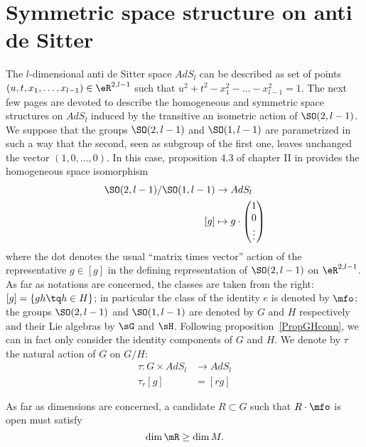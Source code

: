 \section{Symmetric space structure on anti de Sitter}\label{SecSymeStructAdS}

The $l$-dimensional anti de Sitter space $AdS_l$ can be described as set of points $(u,t,x_1,\ldots,x_{l-1})\in \eR^{2,l-1}$  such that $u^2+t^2-x_1^2-\ldots-x_{l-1}^2=1$. The next few pages are devoted to describe the homogeneous and symmetric space structures on $AdS_l$ induced by the transitive an isometric action of $\SO(2,l-1)$. We suppose that the groups $\SO(2,l-1)$ and $\SO(1,l-1)$ are parametrized in such a way that the second, seen as subgroup of the first one, leaves unchanged the vector $(1,0,\ldots,0)$. In this case, proposition 4.3 of chapter II in \cite{Helgason} provides the homogeneous space isomorphism
\begin{equation}
\begin{aligned}
  \SO(2,l-1)/\SO(1,l-1)&\to AdS_l \\
[g]&\mapsto
 g\cdot
\begin{pmatrix}
1\\0\\\vdots
\end{pmatrix}
\end{aligned}
\end{equation}
where the dot denotes the usual ``matrix times vector'' action of the representative $g\in [g]$ in the defining representation of $\SO(2,l-1)$ on $\eR^{2,l-1}$. As far as notations are concerned, the classes are taken from the right:  $[g]=\{gh\tq h\in H\}$; in particular the class of the identity $e$ is denoted by $\mfo$; the groups $\SO(2,l-1)$ and $\SO(1,l-1)$ are denoted by $G$ and $H$ respectively and their Lie algebras by $\sG$ and $\sH$. Following proposition~\ref{PropGHconn}, we can in fact only consider the identity components of $G$ and $H$. We denote by $\tau$ the natural action of $G$ on $G/H$:
\begin{equation}
\begin{aligned}
 \tau\colon G\times AdS_l&\to AdS_l \\
   \tau_r[g]&= [rg]
\end{aligned}
\end{equation}

As far as dimensions are concerned, a candidate $R\subset G$ such that $R\cdot\mfo$ is open must satisfy
\begin{equation}\label{cond_dim}
                  \dim\mR\geq\dim M.
\end{equation}

